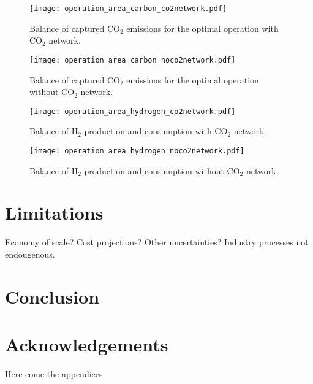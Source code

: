\documentclass[conference]{IEEEtran}
\begin{document}
\begin{figure}
    \centering
    \texttt{[image: operation\_area\_carbon\_co2network.pdf]}
    \caption{Balance of captured CO$_2$ emissions for the optimal operation with CO$_2$ network.}
    \label{fig:operation_area_carbon_co2network}
\end{figure}

\begin{figure}
    \centering
    \texttt{[image: operation\_area\_carbon\_noco2network.pdf]}
    \caption{Balance of captured CO$_2$ emissions for the optimal operation without CO$_2$ network.}
    \label{fig:operation_area_carbon_noco2network}
\end{figure}


\begin{figure}
    \centering
    \texttt{[image: operation\_area\_hydrogen\_co2network.pdf]}
    \caption{Balance of H$_2$ production and consumption with CO$_2$ network.}
    \label{fig:operation_area_carbon_co2network}
\end{figure}

\begin{figure}
    \centering
    \texttt{[image: operation\_area\_hydrogen\_noco2network.pdf]}
    \caption{Balance of H$_2$ production and consumption without CO$_2$ network.}
    \label{fig:operation_area_carbon_noco2network}
\end{figure}


\section{Limitations}
\label{sec:limitations}
Economy of scale? Cost projections? Other uncertainties?
Industry processes not endougenous.

\section{Conclusion}
\label{sec:conclusion}

\section*{Acknowledgements}
\label{sec:acknowledgements}


\newpage

\printbibliography

\appendix

Here come the appendices
\end{document}
